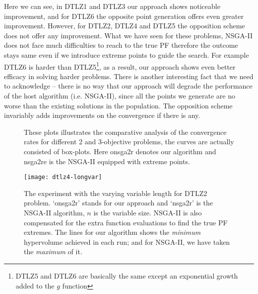 \documentclass[journal]{IEEEtran}
\let\MYoriglatexcaption\caption
\renewcommand{\caption}[2][\relax]{\MYoriglatexcaption[#2]{#2}}
\begin{document}
Here we can see, in DTLZ1 and DTLZ3 our approach shows noticeable improvement, and for DTLZ6 the opposite point generation offers even greater improvement. However, for DTLZ2, DTLZ4 and DTLZ5 the opposition scheme does not offer any improvement. What we have seen for these problems, NSGA-II does not face much difficulties to reach to the true PF therefore the outcome stays same even if we introduce extreme points to guide the search. For example DTLZ6 is harder than DTLZ5\footnote{DTLZ5 and DTLZ6 are basically the same except an exponential growth added to the \(g\) function}, as a result, our approach shows even better efficacy in solving harder problems. There is another interesting fact that we need to acknowledge -- there is no way that our approach will degrade the performance of the host algorithm (i.e. NSGA-II), since all the points we generate are no worse than the existing solutions in the population. The opposition scheme invariably adds improvements on the convergence if there is any. 
%
\begin{figure*}[pb!]
	\centering
	\hfill
		\caption{These plots illustrates the comparative analysis of the convergence rates for different 2 and 3-objective problems, the curves are actually consisted of box-plots. Here onsga2r denotes our algorithm and nsga2re is the NSGA-II equipped with extreme points.}
	\label{plot:nsga2re-hv}
\end{figure*}
%
\begin{figure}[tp]
\centering
\texttt{[image: dtlz4-longvar]}
\caption{The experiment with the varying variable length for DTLZ2 problem. `onsga2r' stands for our approach and `nsga2r' is the NSGA-II algorithm, \(n\) is the variable size. NSGA-II is also compensated for the extra function evaluations to find the true PF extremes. The lines for our algorithm shows the \textit{minimum} hypervolume achieved in each run; and for NSGA-II, we have taken the \textit{maximum} of it.}
\label{plot:longvar}\vspace{-3.0pt}
\end{figure}
%
\end{document}
